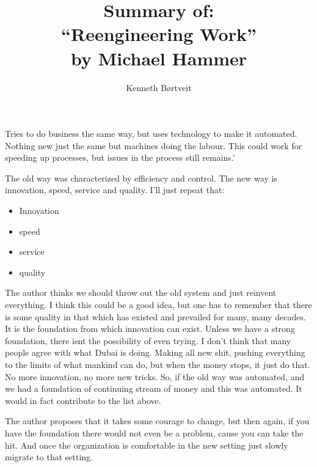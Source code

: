 \documentclass{article}
\title{{\Huge Summary of: \\ ``Reengineering Work''} \\ {\small by Michael Hammer}}
\author{Kenneth Børtveit}
\begin{document}
\maketitle
Tries to do business the same way, but uses technology to make it automated. Nothing new just the same but machines doing the labour.
This could work for speeding up processes, but issues in the process still remains.'

The old way was characterized by efficiency and control. The new way is innovation, speed, service and quality. I'll just repeat that:
\begin{itemize}
\item Innovation
\item speed
\item service
\item quality
\end{itemize}

The author thinks we should throw out the old system and just reinvent everything. I think this could be a good idea, but one has to remember that there is some quality in that which has existed and prevailed for many, many decades. It is the foundation from which innovation can exist. Unless we have a strong foundation, there isnt the possibility of even trying. I don't think that many people agree with what Dubai is doing. Making all new shit, pushing everything to the limits of what mankind can do, but when the money stops, it just do that. No more innovation, no more new tricks. So, if the old way was automated, and we had a foundation of continuing stream of money and this was automated. It would in fact contribute to the list above. 

The author proposes that it takes some courage to change, but then again, if you have the foundation there would not even be a problem, cause you can take the hit. And once the organization is comfortable in the new setting just slowly migrate to that setting. 
\end{document}
